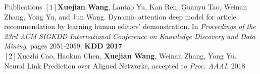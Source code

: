 \documentclass{resume} %
\begin{document}
\begin{rSection}{Publications}
$[1]$\textbf{Xuejian Wang}, Lantao Yu, Kan Ren, Guanyu Tao, Weinan Zhang, Yong Yu, and Jun Wang. Dynamic attention deep model for article recommendation by learning human editors' demonstration. In \emph{Proceedings of the 23rd ACM SIGKDD International Conference on Knowledge Discovery and Data Mining}, pages 2051-2059. \textbf{KDD 2017} \\
$[2]$Xuezhi Cao, Haokun Chen, \textbf{Xuejian Wang}, Weinan Zhang, Yong Yu. Neural Link Prediction over Aligned Networks, accepted to  \emph{Proc. AAAI}, 2018
\end{rSection}
\end{document}
